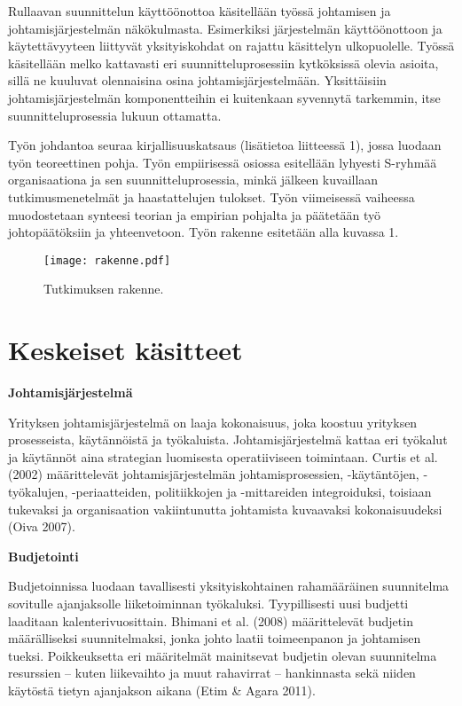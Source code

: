 \documentclass[12pt,a4paper,oneside,pdftex]{report}
\begin{document}
Rullaavan suunnittelun käyttöönottoa käsitellään työssä johtamisen ja johtamisjärjestelmän näkökulmasta. Esimerkiksi järjestelmän käyttöönottoon ja käytettävyyteen liittyvät yksityiskohdat on rajattu käsittelyn ulkopuolelle. Työssä käsitellään melko kattavasti eri suunnitteluprosessiin kytköksissä olevia asioita, sillä ne kuuluvat olennaisina osina johtamisjärjestelmään. Yksittäisiin johtamisjärjestelmän komponentteihin ei kuitenkaan syvennytä tarkemmin, itse suunnitteluprosessia lukuun ottamatta.

Työn johdantoa seuraa kirjallisuuskatsaus (lisätietoa liitteessä 1), jossa luodaan työn teoreettinen pohja. Työn empiirisessä osiossa esitellään lyhyesti S-ryhmää organisaationa ja sen suunnitteluprosessia, minkä jälkeen kuvaillaan tutkimusmenetelmät ja haastattelujen tulokset. Työn viimeisessä vaiheessa muodostetaan synteesi teorian ja empirian pohjalta ja päätetään työ johtopäätöksiin ja yhteenvetoon. Työn rakenne esitetään alla kuvassa 1.

\begin{figure}[ht]
  \begin{center}
    \texttt{[image: rakenne.pdf]}
    \caption{Tutkimuksen rakenne.}
    \label{fig:rakenne}
  \end{center}
\end{figure}

\section{Keskeiset käsitteet}

\textbf{Johtamisjärjestelmä}

Yrityksen johtamisjärjestelmä on laaja kokonaisuus, joka koostuu yrityksen prosesseista, käytännöistä ja työkaluista. Johtamisjärjestelmä kattaa eri työkalut ja käytännöt aina strategian luomisesta operatiiviseen toimintaan. Curtis et al. (2002) määrittelevät johtamisjärjestelmän johtamisprosessien, -käytäntöjen, -työkalujen, -periaatteiden,  politiikkojen ja -mittareiden integroiduksi, toisiaan tukevaksi ja organisaation vakiintunutta johtamista kuvaavaksi kokonaisuudeksi (Oiva 2007).

\textbf{Budjetointi}

Budjetoinnissa luodaan tavallisesti yksityiskohtainen rahamääräinen suunnitelma sovitulle ajanjaksolle liiketoiminnan työkaluksi. Tyypillisesti uusi budjetti laaditaan kalenterivuosittain. Bhimani et al. (2008) määrittelevät budjetin määrälliseksi suunnitelmaksi, jonka johto laatii toimeenpanon ja johtamisen tueksi. Poikkeuksetta eri määritelmät mainitsevat budjetin olevan suunnitelma resurssien – kuten liikevaihto ja muut rahavirrat – hankinnasta sekä niiden käytöstä tietyn ajanjakson aikana (Etim & Agara 2011).
\end{document}
